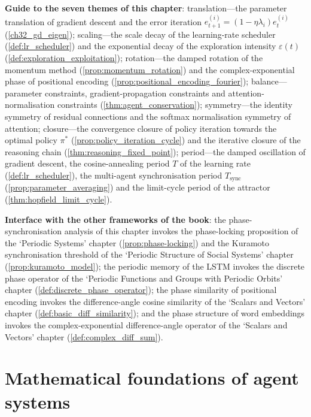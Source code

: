 \begin{remark}
\textbf{Guide to the seven themes of this chapter}: translation---the parameter translation of gradient descent and the error iteration $e_{t+1}^{(i)} = (1-\eta\lambda_i)e_t^{(i)}$ (\cref{ch32_gd_eigen}); scaling---the scale decay of the learning-rate scheduler (\cref{def:lr_scheduler}) and the exponential decay of the exploration intensity $\varepsilon(t)$ (\cref{def:exploration_exploitation}); rotation---the damped rotation of the momentum method (\cref{prop:momentum_rotation}) and the complex-exponential phase of positional encoding (\cref{prop:positional_encoding_fourier}); balance---parameter constraints, gradient-propagation constraints and attention-normalisation constraints (\cref{thm:agent_conservation}); symmetry---the identity symmetry of residual connections and the softmax normalisation symmetry of attention; closure---the convergence closure of policy iteration towards the optimal policy $\pi^*$ (\cref{prop:policy_iteration_cycle}) and the iterative closure of the reasoning chain (\cref{thm:reasoning_fixed_point}); period---the damped oscillation of gradient descent, the cosine-annealing period $T$ of the learning rate (\cref{def:lr_scheduler}), the multi-agent synchronisation period $T_{\text{sync}}$ (\cref{prop:parameter_averaging}) and the limit-cycle period of the attractor (\cref{thm:hopfield_limit_cycle}).

\textbf{Interface with the other frameworks of the book}: the phase-synchronisation analysis of this chapter invokes the phase-locking proposition of the `Periodic Systems' chapter (\cref{prop:phase-locking}) and the Kuramoto synchronisation threshold of the `Periodic Structure of Social Systems' chapter (\cref{prop:kuramoto_model}); the periodic memory of the LSTM invokes the discrete phase operator of the `Periodic Functions and Groups with Periodic Orbits' chapter (\cref{def:discrete_phase_operator}); the phase similarity of positional encoding invokes the difference-angle cosine similarity of the `Scalars and Vectors' chapter (\cref{def:basic_diff_similarity}); and the phase structure of word embeddings invokes the complex-exponential difference-angle operator of the `Scalars and Vectors' chapter (\cref{def:complex_diff_sum}).
\end{remark}

\section{Mathematical foundations of agent systems}

